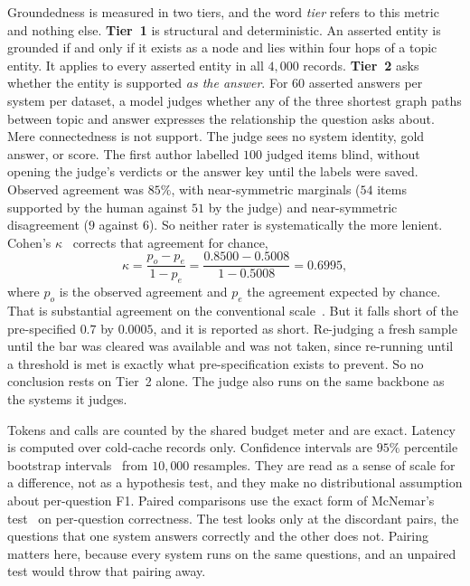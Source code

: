Groundedness is measured in two tiers, and the word \emph{tier} refers to this
metric and nothing else. \textbf{Tier~1} is structural and deterministic. An
asserted entity is grounded if and only if it exists as a node and lies within
four hops of a topic entity. It applies to every asserted entity in all
$4{,}000$ records. \textbf{Tier~2} asks whether the entity is supported \emph{as
the answer}. For $60$ asserted answers per system per dataset, a model judges
whether any of the three shortest graph paths between topic and answer expresses
the relationship the question asks about. Mere connectedness is not support. The
judge sees no system identity, gold answer, or score. The first author labelled
$100$ judged items blind, without opening the judge's verdicts or the answer key
until the labels were saved. Observed agreement was $85\%$, with near-symmetric
marginals ($54$ items supported by the human against $51$ by the judge) and
near-symmetric disagreement ($9$ against $6$). So neither rater is
systematically the more lenient. Cohen's $\kappa$~\cite{cohen1960coefficient}
corrects that agreement for chance,
\begin{equation}
\kappa = \frac{p_o - p_e}{1 - p_e} = \frac{0.8500 - 0.5008}{1 - 0.5008} = 0.6995,
\end{equation}
where $p_o$ is the observed agreement and $p_e$ the agreement expected by
chance. That is substantial agreement
on the conventional scale~\cite{landis1977measurement}. But it falls short of
the
pre-specified $0.7$ by $0.0005$, and it is reported as short. Re-judging a fresh
sample until the bar was cleared was available and was not taken, since
re-running until a threshold is met is exactly what pre-specification exists to
prevent. So no conclusion rests on Tier~2 alone. The judge also runs
on the same backbone as the systems it judges.

Tokens and calls are counted by the shared budget meter and are exact. Latency
is computed over cold-cache records only. Confidence intervals are $95\%$
percentile bootstrap intervals~\cite{efron1979bootstrap} from $10{,}000$
resamples. They are read as a sense of scale for a difference, not as a
hypothesis test, and they make no distributional assumption about per-question
F1. Paired comparisons use the exact form of McNemar's
test~\cite{mcnemar1947note} on per-question correctness. The test looks only at
the discordant pairs, the questions that one system answers correctly and the
other does not. Pairing matters here, because every system runs on the same
questions, and an unpaired test would throw that pairing away.


